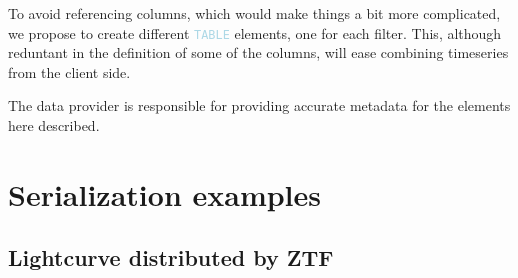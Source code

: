 \documentclass[11pt,a4paper]{ivoa}
\newcommand\elem[1]{\textcolor{LightBlue}{{\tt#1}}}
\begin{document}
\begingroup

\endgroup


To avoid referencing columns, which would make things a bit more complicated, we propose to create different \elem{TABLE} elements, one for each filter. This, although reduntant in the definition of some of the columns, will ease combining timeseries from the client side. 




The data provider is responsible for providing accurate metadata for the elements here described.

\section{Serialization examples}
\subsection{Lightcurve distributed by ZTF}
\end{document}
